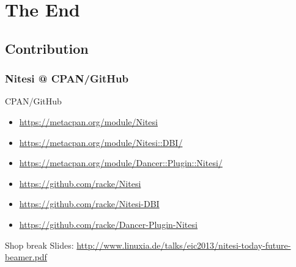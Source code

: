 \section{The End}

\subsection{Contribution}
\subsubsection{Nitesi @ CPAN/GitHub}
\begin{frame}{CPAN/GitHub}
\begin{itemize}
\item \url{https://metacpan.org/module/Nitesi}
\item \url{https://metacpan.org/module/Nitesi::DBI/}
\item \url{https://metacpan.org/module/Dancer::Plugin::Nitesi/}
\end{itemize}
\begin{itemize}
\item \url{https://github.com/racke/Nitesi}
\item \url{https://github.com/racke/Nitesi-DBI}
\item \url{https://github.com/racke/Dancer-Plugin-Nitesi}
\end{itemize}
\end{frame}

\begin{frame}{Shop break}
Slides:
\url{http://www.linuxia.de/talks/eic2013/nitesi-today-future-beamer.pdf}
\end{frame}



